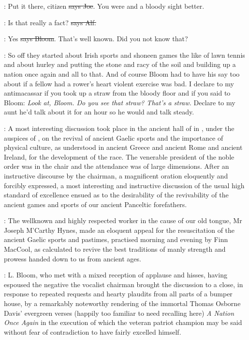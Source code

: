 \joe:
Put it there, citizen \sout{says Joe}.
You were and a bloody sight better.

\bergan:
Is that really a fact? \sout{says Alf.}

\Bloom:
Yes \sout{says Bloom}.
That's well known. Did you not know that?

\Nq:
So off they started about Irish sports and shoneen games the like of lawn
tennis and about hurley
and putting the stone and racy of the soil and
building up a nation once again and all to that. And of course Bloom had
to have his say too about if a fellow had a rower's heart violent
exercise was bad. I declare to my antimacassar if you took up a
straw from the bloody floor and if you said to Bloom: \emph{Look at, Bloom.
Do you see that straw? That's a straw.} Declare to my aunt he'd talk
about it for an hour so he would and talk steady.

:
A most interesting discussion took place in the ancient hall of
 in ,
under the auspices of ,
on the revival of ancient Gaelic sports and the importance of
physical culture,
as understood in ancient Greece and ancient Rome and
ancient Ireland, for the development of the race. The venerable president
of the noble order was in the chair and the attendance was of large
dimensions. After an instructive discourse by the chairman, a magnificent
oration eloquently and forcibly expressed, a most interesting and
instructive discussion of the usual high standard of excellence
ensued as to the desirability of the revivability of the ancient
games and sports of our ancient Panceltic forefathers.

:
The wellknown and highly respected worker in the cause of our old
tongue, Mr Joseph M'Carthy Hynes, made an eloquent appeal for
the resuscitation of the ancient Gaelic sports and pastimes,
practised morning and evening by Finn MacCool,
as calculated to revive the
best traditions of manly strength and prowess handed down to us from
ancient ages.

:
L. Bloom, who met with a mixed reception of applause and
hisses, having espoused the negative the vocalist chairman brought the
discussion to a close, in response to repeated requests and hearty
plaudits from all parts of a bumper house, by a remarkably noteworthy
rendering of the immortal Thomas Osborne Davis' evergreen verses (happily
too familiar to need recalling here) \emph{A Nation Once Again} in the execution
of which the veteran patriot champion may be said without fear of
contradiction to have fairly excelled himself.


